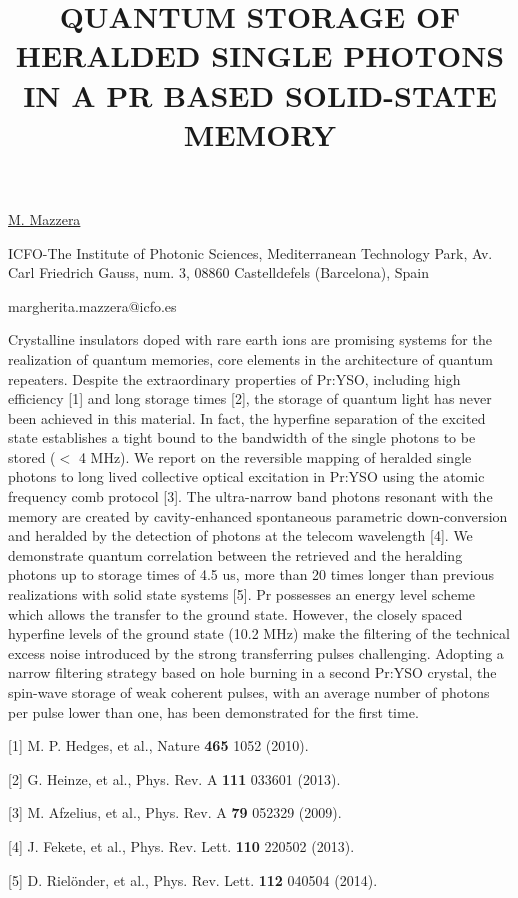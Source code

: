 \title{QUANTUM STORAGE OF HERALDED SINGLE PHOTONS IN A PR BASED SOLID-STATE MEMORY}

\underline{M. Mazzera} 

{\normalsize{\vspace{-4mm}
ICFO-The Institute of Photonic Sciences,
Mediterranean Technology Park,
Av. Carl Friedrich Gauss, num. 3,
08860 Castelldefels (Barcelona), Spain

\email margherita.mazzera@icfo.es}}

Crystalline insulators doped with rare earth ions are promising systems for the realization of quantum memories, core elements in the architecture of quantum repeaters.
Despite the extraordinary properties of Pr:YSO,  including high efficiency [1] and long storage times [2], the storage of quantum light has never been achieved in this material. In fact, the hyperfine separation of the excited state establishes a tight bound to the bandwidth of the single photons to be stored ($<$ 4 MHz).
We report on the reversible mapping of heralded single photons to long lived collective optical excitation in Pr:YSO using the atomic frequency comb protocol [3]. The ultra-narrow band photons resonant with the memory are created by cavity-enhanced spontaneous parametric down-conversion and heralded by the detection of photons at the telecom wavelength [4]. We demonstrate quantum correlation between the retrieved and the heralding photons up to storage times of 4.5 us, more than 20 times longer than previous realizations with solid state systems [5]. Pr possesses an energy level scheme which allows the transfer to the ground state. However, the closely spaced hyperfine levels of the ground state (10.2 MHz) make the filtering of the technical excess noise introduced by the strong transferring pulses challenging. Adopting a narrow filtering strategy based on hole burning in a second Pr:YSO crystal, the spin-wave storage of weak coherent pulses, with an average number of photons per pulse lower than one, has been demonstrated for the first time.

{\normalsize
[1] M. P. Hedges, et al., Nature \textbf{465} 1052 (2010).
\vsp

[2] G. Heinze, et al., Phys. Rev. A \textbf{111} 033601 (2013).
\vsp

[3] M. Afzelius, et al., Phys. Rev. A \textbf{79} 052329 (2009).
\vsp

[4] J. Fekete, et al., Phys. Rev. Lett. \textbf{110} 220502 (2013).
\vsp

[5] D. Riel\"{o}nder, et al., Phys. Rev. Lett. \textbf{112} 040504 (2014).
}

\vspace{\baselineskip}
